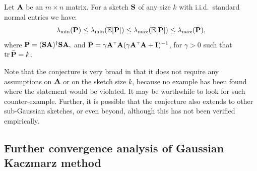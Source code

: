 \documentclass[11pt]{article}
\begin{document}
\begin{conjecture}\label{h:extreme}
Let $\A$ be an $m\times n$ matrix. For a sketch $\S$ of any size $k$ with
  i.i.d.~standard normal entries we have:
\begin{align*}
  \lambda_{\min}(\bar\P)\leq \lambda_{\min}(\E[\P])\leq
  \lambda_{\max}(\E[\P])\leq \lambda_{\max}(\bar\P),
\end{align*}
where $\P= (\S\A)^\dagger\S\A,$ and
$\bar\P=\gamma\A^\top\A(\gamma\A^\top\A + \I)^{-1}$,
for $\gamma>0$  such that $\tr\,\bar\P= k$.
\end{conjecture}

\noindent
Note that the conjecture is very broad in that it does not require any
assumptions on $\A$ or on the sketch size $k$, because no
example has been found where the statement would be violated. It may
be worthwhile to look for such counter-example.
Further, it is possible that the conjecture also extends to other
sub-Gaussian sketches, or even beyond, although this has not been
verified empirically.

\subsection{Further convergence analysis of Gaussian Kaczmarz method}
\end{document}
